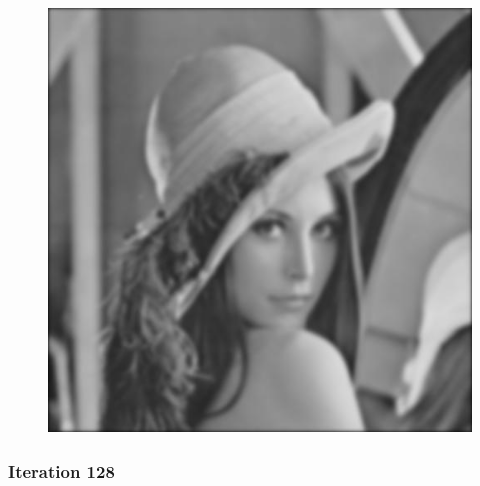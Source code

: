 \documentclass[11pt]{article}
\makeatletter
\def\maxwidth{\ifdim\Gin@nat@width>\linewidth\linewidth
    \else\Gin@nat@width\fi}
\let\Oldincludegraphics\includegraphics
\renewcommand{\includegraphics}[1]{\Oldincludegraphics[width=.8\maxwidth]{#1}}
\makeatother
\begin{document}
\begin{figure}[!htbp]
	\centering
	\includegraphics{"63th iterations_const"}
	\label{fig:63th-iterationsconst}
\end{figure}
\clearpage
    \hypertarget{iteration-128}{%
\subsubsection{Iteration 128}\label{iteration-128}}
\end{document}
